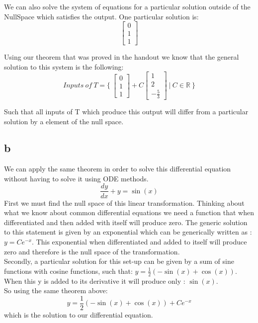 \documentclass[12pt]{article}
\begin{document}
We can also solve the system of equations for a particular solution outside of the NullSpace which satisfies the output. One particular solution is:\\
\[
\begin{bmatrix}
0\\
1\\
1
\end{bmatrix}
\]

Using our theorem that was proved in the handout we know that the general solution to this system is the following:
\[
Inputs\ of\ T =
\{ \ 
\begin{bmatrix}
0\\
1\\
1
\end{bmatrix}
+
C
\begin{bmatrix}
1\\
2\\
-\frac{5}{3}
\end{bmatrix}
\ | \
C \in \mathbb{R} \ 
\}
\]

Such that all inputs of T which produce this output will differ from a particular solution by a element of the null space.

\subsection*{b}

We can apply the same theorem in order to solve this differential equation without having to solve it using ODE methods.
$$ \frac{dy}{dx} + y = \sin (x) $$
First we must find the null space of this linear transformation. Thinking about what we know about common differential equations we need a function that when differentiated and then added with itself will produce zero. The generic solution to this statement is given by an exponential which can be generically written as : $y = Ce^{-x}$. This exponential when differentiated and added to itself will produce zero and therefore is the null space of the transformation.\\

Secondly, a particular solution for this set-up can be given by a sum of sine functions with cosine functions, such that: $y = \frac{1}{2}(-\sin (x) + \cos (x))$. When this y is added to its derivative it will produce only : $\sin (x)$.\\

So using the same theorem above:
$$ y = \frac{1}{2}(-\sin (x) + \cos (x)) + Ce^{-x} $$ which is the solution to our differential equation. 
\end{document}
